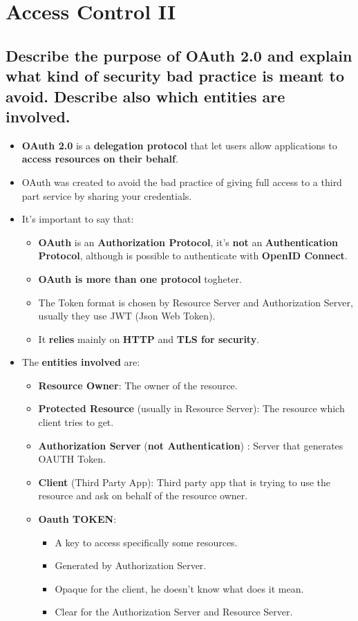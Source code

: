 \documentclass[9pt, letterpaper]{article}
\begin{document}
\newpage

\section{Access Control II}

\subsection{Describe the purpose of OAuth 2.0 and explain what kind of security bad practice is meant to avoid. Describe also which entities are involved.}
\begin{itemize}
	\item \textbf{OAuth 2.0} is a \textbf{delegation protocol} that let users allow applications to \textbf{access resources on their behalf}.
	\item OAuth was created to avoid the bad practice of giving full access to a third part service by sharing your credentials.
	\item It's important to say that:
	\begin{itemize}
		\item \textbf{OAuth} is an \textbf{Authorization Protocol}, it's \textbf{not} an \textbf{Authentication Protocol}, although is possible to authenticate with \textbf{OpenID Connect}.
		\item \textbf{OAuth is more than one protocol} togheter.
		\item The Token format is chosen by Resource Server and Authorization Server, usually they use JWT (Json Web Token).
		\item It \textbf{relies} mainly on \textbf{HTTP} and \textbf{TLS for security}.
	\end{itemize}
	\item The \textbf{entities involved} are:
	\begin{itemize}
		\item \textbf{Resource Owner}: The owner of the resource.
		\item \textbf{Protected Resource} (usually in Resource Server): The resource which client tries to get.
		\item \textbf{Authorization Server} (\textbf{not Authentication}) : Server that generates OAUTH Token.
		\item \textbf{Client} (Third Party App): Third party app that is trying to use the resource and ask on behalf of the resource owner.
		\item \textbf{Oauth TOKEN}:
		\begin{itemize}
			\item A key to access specifically some resources.
			\item Generated by Authorization Server.
			\item Opaque for the client, he doesn't know what does it mean.
			\item Clear for the Authorization Server and Resource Server.
		\end{itemize}
	\end{itemize}
\end{itemize}
\end{document}
